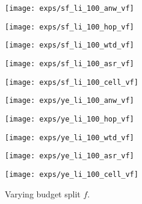 \documentclass{USC-Thesis}
\numberwithin{equation}{chapter}
\begin{document}
\begin{figure*}[tbh]
\begin{minipage}[b]{0.195\linewidth}
	\centering
		\texttt{[image: exps/sf\_li\_100\_anw\_vf]}
		\label{fig:sf_li_100_anw_vf}
	\end{minipage}
	\begin{minipage}[b]{0.195\linewidth}
	\centering
		\texttt{[image: exps/sf\_li\_100\_hop\_vf]}
		\label{fig:sf_li_100_hop_vf}
	\end{minipage}
	\begin{minipage}[b]{0.195\linewidth}
	\centering
		\texttt{[image: exps/sf\_li\_100\_wtd\_vf]}
		\label{fig:sf_li_100_atd_vf}
	\end{minipage}
	\begin{minipage}[b]{0.195\linewidth}
		\centering
		\texttt{[image: exps/sf\_li\_100\_asr\_vf]}
		\label{fig:sf_li_100_asr_vf}
	\end{minipage}
	\begin{minipage}[b]{0.195\linewidth}
		\centering
		\texttt{[image: exps/sf\_li\_100\_cell\_vf]}
		\label{fig:sf_li_100_cell_vf}
	\end{minipage}	
	
	
	\begin{minipage}[b]{0.195\linewidth}
	\centering
		\texttt{[image: exps/ye\_li\_100\_anw\_vf]}
		\label{fig:ye_li_100_anw_vf}
	\end{minipage}
	\begin{minipage}[b]{0.195\linewidth}
	\centering
		\texttt{[image: exps/ye\_li\_100\_hop\_vf]}
		\label{fig:ye_li_100_hop_vf}
	\end{minipage}
	\begin{minipage}[b]{0.195\linewidth}
	\centering
		\texttt{[image: exps/ye\_li\_100\_wtd\_vf]}
		\label{fig:ye_li_100_atd_vf}
	\end{minipage}
	\begin{minipage}[b]{0.195\linewidth}
		\centering
		\texttt{[image: exps/ye\_li\_100\_asr\_vf]}
		\label{fig:ye_li_100_asr_vf}
	\end{minipage}
	\begin{minipage}[b]{0.195\linewidth}
		\centering
		\texttt{[image: exps/ye\_li\_100\_cell\_vf]}
		\label{fig:ye_li_100_cell_vf}
	\end{minipage}
	\caption{Varying budget split $f$.}
\label{fig:varying_f}
\end{figure*}
\end{document}
